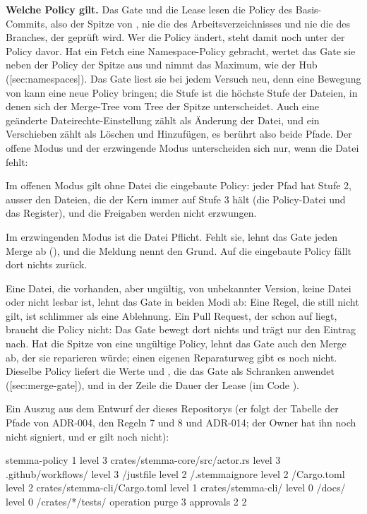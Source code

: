 {\bf Welche Policy gilt.}
Das Gate und die Lease lesen die Policy des Basis-Commits, also der Spitze von ,
nie die des Arbeitsverzeichnisses und nie die des Branches, der geprüft wird.
Wer die Policy ändert, steht damit noch unter der Policy davor.
Hat ein Fetch eine Namespace-Policy gebracht, wertet das Gate sie neben der Policy der Spitze
aus und nimmt das Maximum, wie der Hub ([sec:namespaces]).
Das Gate liest sie bei jedem Versuch neu, denn eine Bewegung von  kann eine neue
Policy bringen; die Stufe ist die höchste Stufe der Dateien, in denen sich der Merge-Tree vom
Tree der Spitze unterscheidet.
Auch eine geänderte Dateirechte-Einstellung zählt als Änderung der Datei,
und ein Verschieben zählt als Löschen und Hinzufügen, es berührt also beide Pfade.
Der offene Modus und der erzwingende Modus unterscheiden sich nur, wenn die Datei fehlt:
\startitemize
\item Im offenen Modus gilt ohne Datei die eingebaute Policy: jeder Pfad hat Stufe 2, ausser den
Dateien, die der Kern immer auf Stufe 3 hält (die Policy-Datei und das Register),
und die Freigaben werden nicht erzwungen.
\item Im erzwingenden Modus ist die Datei Pflicht.
Fehlt sie, lehnt das Gate jeden Merge ab (),
und die Meldung nennt den Grund.
Auf die eingebaute Policy fällt dort nichts zurück.
\item Eine Datei, die vorhanden, aber ungültig, von unbekannter Version, keine Datei oder nicht
lesbar ist, lehnt das Gate in beiden Modi ab:
Eine Regel, die still nicht gilt, ist schlimmer als eine Ablehnung.
\stopitemize
Ein Pull Request, der schon auf  liegt, braucht die Policy nicht:
Das Gate bewegt dort nichts und trägt nur den Eintrag nach.
Hat die Spitze von  eine ungültige Policy, lehnt das Gate auch den Merge ab, der sie
reparieren würde; einen eigenen Reparaturweg gibt es noch nicht.
Dieselbe Policy liefert die Werte  und , die das Gate als
Schranken anwendet ([sec:merge-gate]), und in der Zeile  die Dauer der
Lease (im Code ).

Ein Auszug aus dem Entwurf der  dieses Repositorys
(er folgt der Tabelle der Pfade von ADR-004, den Regeln 7 und 8 und ADR-014;
der Owner hat ihn noch nicht signiert, und er gilt noch nicht):

\starttyping
stemma-policy 1
level 3 crates/stemma-core/src/actor.rs
level 3 .github/workflows/
level 3 /justfile
level 2 /.stemmaignore
level 2 /Cargo.toml
level 2 crates/stemma-cli/Cargo.toml
level 1 crates/stemma-cli/
level 0 /docs/
level 0 /crates/*/tests/
operation purge 3
approvals 2 2
\stoptyping

